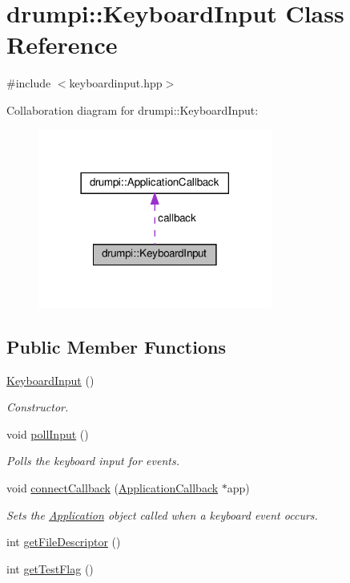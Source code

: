 \hypertarget{classdrumpi_1_1KeyboardInput}{}\section{drumpi\+:\+:Keyboard\+Input Class Reference}
\label{classdrumpi_1_1KeyboardInput}


{\ttfamily \#include $<$keyboardinput.\+hpp$>$}



Collaboration diagram for drumpi\+:\+:Keyboard\+Input\+:
\nopagebreak
\begin{figure}[H]
\begin{center}
\leavevmode
\includegraphics[width=218pt]{classdrumpi_1_1KeyboardInput__coll__graph}
\end{center}
\end{figure}
\subsection*{Public Member Functions}
\begin{DoxyCompactItemize}
\item 
\hyperlink{classdrumpi_1_1KeyboardInput_a92d9c25232e73f2d9319c79df028cc69}{Keyboard\+Input} ()
\begin{DoxyCompactList}\small\item\em Constructor. \end{DoxyCompactList}\item 
void \hyperlink{classdrumpi_1_1KeyboardInput_ac74a81a24054aa5e927e03b4ba7f8c9f}{poll\+Input} ()
\begin{DoxyCompactList}\small\item\em Polls the keyboard input for events. \end{DoxyCompactList}\item 
void \hyperlink{classdrumpi_1_1KeyboardInput_acd7e27115fbb3b81bc3d1b771ef89ca8}{connect\+Callback} (\hyperlink{classdrumpi_1_1ApplicationCallback}{Application\+Callback} $\ast$app)
\begin{DoxyCompactList}\small\item\em Sets the \hyperlink{classdrumpi_1_1Application}{Application} object called when a keyboard event occurs. \end{DoxyCompactList}\item 
int \hyperlink{classdrumpi_1_1KeyboardInput_a9541bb7ef3f3c78c448e7b18aec1dbd7}{get\+File\+Descriptor} ()
\item 
int \hyperlink{classdrumpi_1_1KeyboardInput_a657e489023c7fe835a53d7b24c1eec39}{get\+Test\+Flag} ()
\end{DoxyCompactItemize}
